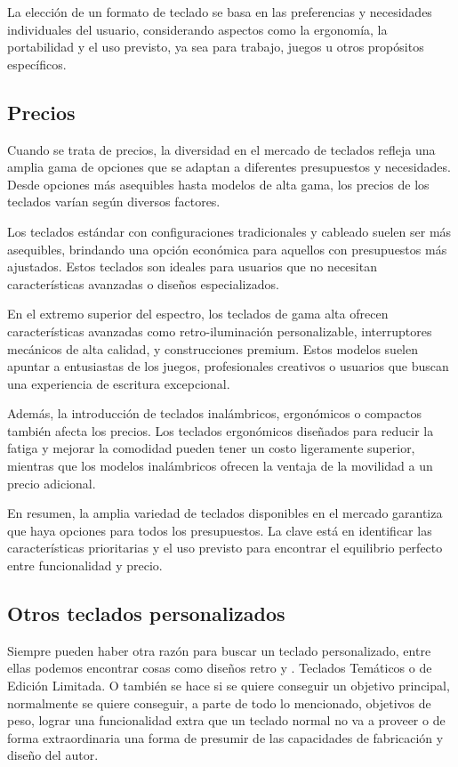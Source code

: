 La elección de un formato de teclado se basa en las preferencias y necesidades individuales del usuario, considerando aspectos como la ergonomía, la portabilidad y el uso previsto, ya sea para trabajo, juegos u otros propósitos específicos. \cite{Keyboards-types}

\subsection{Precios}
Cuando se trata de precios, la diversidad en el mercado de teclados refleja una amplia gama de opciones que se adaptan a diferentes presupuestos y necesidades. Desde opciones más asequibles hasta modelos de alta gama, los precios de los teclados varían según diversos factores.

Los teclados estándar con configuraciones tradicionales y cableado suelen ser más asequibles, brindando una opción económica para aquellos con presupuestos más ajustados. Estos teclados son ideales para usuarios que no necesitan características avanzadas o diseños especializados.

En el extremo superior del espectro, los teclados de gama alta ofrecen características avanzadas como retro-iluminación personalizable, interruptores mecánicos de alta calidad, y construcciones premium. Estos modelos suelen apuntar a entusiastas de los juegos, profesionales creativos o usuarios que buscan una experiencia de escritura excepcional.

Además, la introducción de teclados inalámbricos, ergonómicos o compactos también afecta los precios. Los teclados ergonómicos diseñados para reducir la fatiga y mejorar la comodidad pueden tener un costo ligeramente superior, mientras que los modelos inalámbricos ofrecen la ventaja de la movilidad a un precio adicional.

En resumen, la amplia variedad de teclados disponibles en el mercado garantiza que haya opciones para todos los presupuestos. La clave está en identificar las características prioritarias y el uso previsto para encontrar el equilibrio perfecto entre funcionalidad y precio. \cite{Keyboards-Prices}

\subsection{Otros teclados personalizados}
Siempre pueden haber otra razón para buscar un teclado personalizado, entre ellas podemos encontrar cosas como diseños retro y . Teclados Temáticos o de Edición Limitada. 
O también se hace si se quiere conseguir un objetivo principal, normalmente se quiere conseguir, a parte de todo lo mencionado, objetivos de peso, lograr una funcionalidad extra que un teclado normal no va a proveer o de forma extraordinaria una forma de presumir de las capacidades de fabricación y diseño del autor.